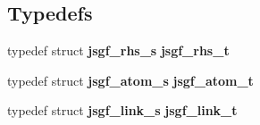 \subsection*{Typedefs}
\begin{DoxyCompactItemize}
\item 
typedef struct {\bf jsgf\-\_\-rhs\-\_\-s} {\bfseries jsgf\-\_\-rhs\-\_\-t}\label{jsgf__internal_8h_ad8fc00ae94c7a558005de3e89c35142f}

\item 
typedef struct {\bf jsgf\-\_\-atom\-\_\-s} {\bfseries jsgf\-\_\-atom\-\_\-t}\label{jsgf__internal_8h_a439a04913bdb6a58d86ad152b952f0ee}

\item 
typedef struct {\bf jsgf\-\_\-link\-\_\-s} {\bfseries jsgf\-\_\-link\-\_\-t}\label{jsgf__internal_8h_a5b84ef71c936d856751f19992a7245eb}

\end{DoxyCompactItemize}
